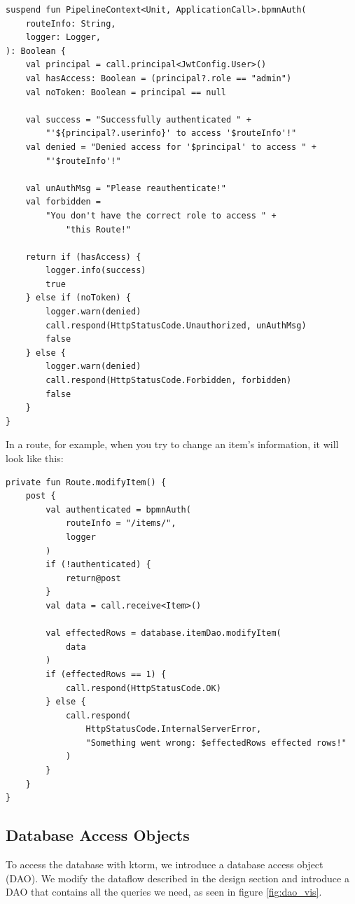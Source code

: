 \begin{verbatim}
suspend fun PipelineContext<Unit, ApplicationCall>.bpmnAuth(
    routeInfo: String,
    logger: Logger,
): Boolean {
    val principal = call.principal<JwtConfig.User>()
    val hasAccess: Boolean = (principal?.role == "admin")
    val noToken: Boolean = principal == null

    val success = "Successfully authenticated " +
        "'${principal?.userinfo}' to access '$routeInfo'!"
    val denied = "Denied access for '$principal' to access " +
        "'$routeInfo'!"

    val unAuthMsg = "Please reauthenticate!"
    val forbidden =
        "You don't have the correct role to access " +
            "this Route!"

    return if (hasAccess) {
        logger.info(success)
        true
    } else if (noToken) {
        logger.warn(denied)
        call.respond(HttpStatusCode.Unauthorized, unAuthMsg)
        false
    } else {
        logger.warn(denied)
        call.respond(HttpStatusCode.Forbidden, forbidden)
        false
    }
}
\end{verbatim}

In a route, for example, when you try to change an item's information, it will look like this:

\begin{verbatim}
private fun Route.modifyItem() {
    post {
        val authenticated = bpmnAuth(
            routeInfo = "/items/",
            logger
        )
        if (!authenticated) {
            return@post
        }
        val data = call.receive<Item>()

        val effectedRows = database.itemDao.modifyItem(
            data
        )
        if (effectedRows == 1) {
            call.respond(HttpStatusCode.OK)
        } else {
            call.respond(
                HttpStatusCode.InternalServerError,
                "Something went wrong: $effectedRows effected rows!"
            )
        }
    }
}
\end{verbatim}

\subsection{Database Access Objects}

To access the database with ktorm, we introduce a database access object (DAO). We modify the dataflow described in the design section and introduce a DAO that contains all the queries we need, as seen in figure \ref{fig:dao_vis}.

